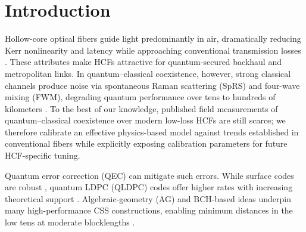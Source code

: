 \documentclass{article}
\begin{document}
\section{Introduction}
Hollow-core optical fibers guide light predominantly in air, dramatically reducing Kerr nonlinearity and latency while approaching conventional transmission losses \cite{Benabid2006JLT,Poletti2014OPEX}. These attributes make HCFs attractive for quantum-secured backhaul and metropolitan links. In quantum--classical coexistence, however, strong classical channels produce noise via spontaneous Raman scattering (SpRS) and four-wave mixing (FWM), degrading quantum performance over tens to hundreds of kilometers \cite{Eraerds2010NJP,Patel2012PRX,Kumar2015NJP}. To the best of our knowledge, published field measurements of quantum--classical coexistence over modern low-loss HCFs are still scarce; we therefore calibrate an effective physics-based model against trends established in conventional fibers while explicitly exposing calibration parameters for future HCF-specific tuning.

Quantum error correction (QEC) can mitigate such errors. While surface codes are robust \cite{Fowler2012PRA}, quantum LDPC (QLDPC) codes offer higher rates with increasing theoretical support \cite{Kovalev2013PRA,TillichZemor2014TIT,BreuckmannEberhardt2021PRXQ,Panteleev2022STOC}. Algebraic-geometry (AG) and BCH-based ideas underpin many high-performance CSS constructions, enabling minimum distances in the low tens at moderate blocklengths \cite{Ashikhmin2001PRA,ChenLing2008TIT}.
\end{document}

